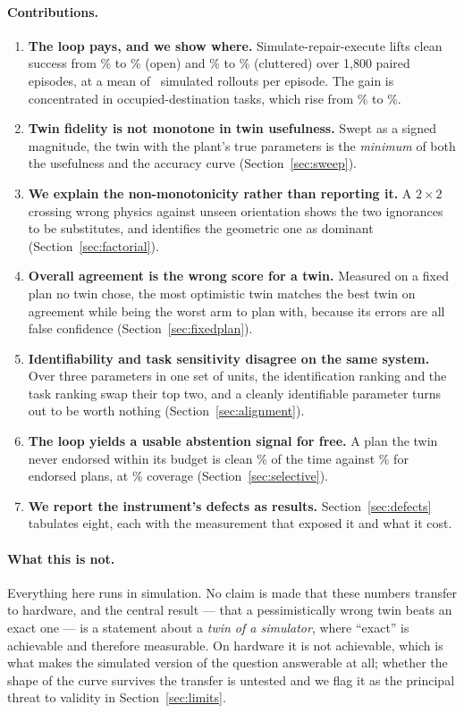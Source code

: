 \documentclass[11pt,a4paper]{article}
\begin{document}
\paragraph{Contributions.}
\begin{enumerate}[leftmargin=1.4em]
\item \textbf{The loop pays, and we show where.} Simulate-repair-execute lifts
clean success from \numDirectOpenClean\% to \numLoopOpenClean\% (open) and
\numDirectClutClean\% to \numLoopClutClean\% (cluttered) over 1{,}800 paired
episodes, at a mean of \numLoopClutSims\ simulated rollouts per episode. The gain
is concentrated in occupied-destination tasks, which rise from
\numDirectClutOcc\% to \numLoopClutOcc\%.
\item \textbf{Twin fidelity is not monotone in twin usefulness.} Swept as a
signed magnitude, the twin with the plant's true parameters is the
\emph{minimum} of both the usefulness and the accuracy curve
(Section~\ref{sec:sweep}).
\item \textbf{We explain the non-monotonicity rather than reporting it.} A
$2\times2$ crossing wrong physics against unseen orientation shows the two
ignorances to be substitutes, and identifies the geometric one as dominant
(Section~\ref{sec:factorial}).
\item \textbf{Overall agreement is the wrong score for a twin.} Measured on a
fixed plan no twin chose, the most optimistic twin matches the best twin on
agreement while being the worst arm to plan with, because its errors are all
false confidence (Section~\ref{sec:fixedplan}).
\item \textbf{Identifiability and task sensitivity disagree on the same
system.} Over three parameters in one set of units, the identification ranking
and the task ranking swap their top two, and a cleanly identifiable parameter
turns out to be worth nothing (Section~\ref{sec:alignment}).
\item \textbf{The loop yields a usable abstention signal for free.} A plan the
twin never endorsed within its budget is clean \numSelPoolUn\% of the time
against \numSelPoolEnd\% for endorsed plans, at \numSelPoolCov\% coverage
(Section~\ref{sec:selective}).
\item \textbf{We report the instrument's defects as results.} Section~\ref{sec:defects}
tabulates eight, each with the measurement that exposed it and what it cost.
\end{enumerate}

\paragraph{What this is not.} Everything here runs in simulation. No claim is
made that these numbers transfer to hardware, and the central result --- that a
pessimistically wrong twin beats an exact one --- is a statement about a
\emph{twin of a simulator}, where ``exact'' is achievable and therefore
measurable. On hardware it is not achievable, which is what makes the simulated
version of the question answerable at all; whether the shape of the curve
survives the transfer is untested and we flag it as the principal threat to
validity in Section~\ref{sec:limits}.
\end{document}
